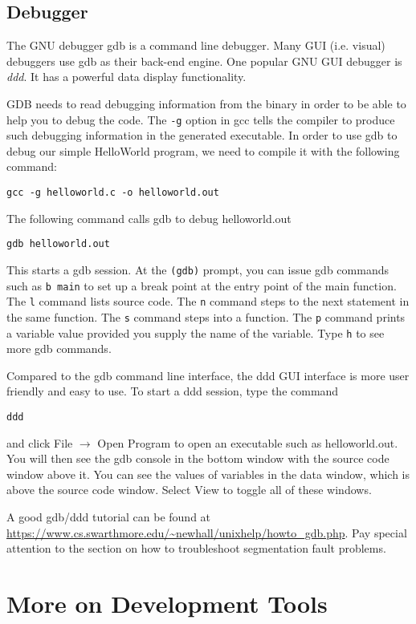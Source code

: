 \subsection{Debugger}
The GNU debugger gdb is a command line debugger. Many GUI (i.e. visual)  debuggers use gdb as their back-end engine. One popular GNU GUI debugger is {\em ddd}. It has a powerful data display functionality. 

GDB needs to read debugging information from the binary in order to be able to help you to debug the code. The \verb+-g+ option in gcc tells the compiler to produce such debugging information in the generated executable. In order to use gdb to debug our simple HelloWorld program, we need to compile it with the following command:
\begin{lstlisting}[style=bash]
gcc -g helloworld.c -o helloworld.out
\end{lstlisting}

The following command calls gdb to debug helloworld.out 
\begin{lstlisting}[style=bash]
gdb helloworld.out 
\end{lstlisting}
This starts a gdb session. At the \verb+(gdb)+ prompt, you can issue gdb commands such as \verb+b main+ to set up a break point at the entry point of the main function. The \verb+l+ command lists source code. The \verb+n+ command steps to the next statement in the same function. The \verb+s+ command steps into a function. The \verb+p+ command prints a variable value provided you supply the name of the variable. Type \verb+h+ to see more gdb commands.


Compared to the gdb command line interface, the ddd GUI interface is more user friendly and easy to use. To start a ddd session,
type the command
\begin{lstlisting}[style=bash]
ddd 
\end{lstlisting}
and click File $\rightarrow$ Open Program to open an executable such as helloworld.out. You will then see the gdb console in the bottom window with the source code window above it. You can see the values of variables in the data window, which is above the source code window. Select View to toggle all of these windows. 

A good gdb/ddd tutorial can be found at \url{https://www.cs.swarthmore.edu/~newhall/unixhelp/howto_gdb.php}. Pay special attention to the section on how to troubleshoot segmentation fault problems.
\section{More on Development Tools}

